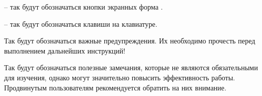   -- так будут обозначаться кнопки экранных форма \tmis .
 
  -- так будут обозначаться клавиши на клавиатуре.
 
 \begin{vnim}
  Так будут обозначаться важные предупреждения. Их необходимо прочесть перед выполнением дальнейших инструкций!
 \end{vnim}
 
 \begin{prim}
 Так будут обозначаться полезные замечания, которые не являются обязательными для изучения, однако могут значительно повысить эффективность работы. Продвинутым пользователям рекомендуется обратить на них внимание.
 \end{prim}
